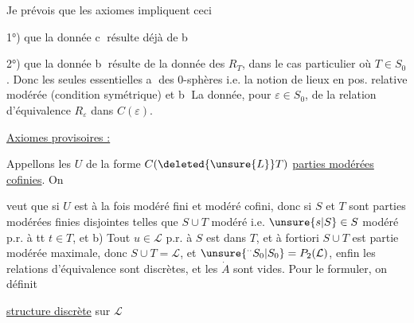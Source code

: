 Je prévois que les axiomes impliquent
ceci

1°) que la donnée \textcircled{\scriptsize c} résulte déjà de \textcircled{\scriptsize b}

2°) que la donnée \textcircled{\scriptsize b} résulte de
la donnée des $R_T$,  dans le cas
particulier où $T\in S_0$. Donc
les seules  essentielles 
\textcircled{\scriptsize a}  des 0-sphères i.e. la notion
de  lieux en pos. relative modérée
(condition  symétrique) et \textcircled{\scriptsize b} La donnée,
pour  $\varepsilon\in S_0$, de la relation
d'équivalence $R_{\varepsilon}$ dans $C(\varepsilon)$.

 \uline{Axiomes provisoires :}

 Appellons les $U$ de la forme
$C(\deleted{\unsure{L}}T)$ \uline{parties modérées cofinies}. On


veut que si $U$  est à la fois modéré fini
et modéré cofini, donc si $S$ et $T$
sont  parties modérées finies
 disjointes telles que   $S\cup T$
modéré i.e.  $\unsure{s|S}\in S$ modéré p.r. à tt
$t\in T$, et b) Tout $u\in\mathcal L$  p.r. à
$S$ est dans $T$\unsure{;|,},  et
à fortiori $S\cup T$ est partie  modérée
maximale, donc $S\cup T=\mathcal L$, et
$\unsure{{}^{\cdot\cdot}S_0|S_0}=P_2(\mathcal L)$, enfin les relations
d'équivalence sont discrètes, et les
$\dot A$ sont vides. Pour le formuler,
on définit 

  \uline{structure  discrète} sur $\mathcal L$

